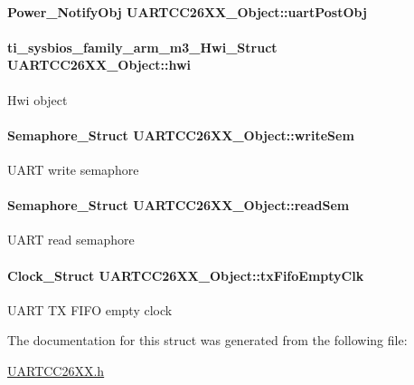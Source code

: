 \paragraph[{uart\-Post\-Obj}]{\setlength{\rightskip}{0pt plus 5cm}Power\-\_\-\-Notify\-Obj U\-A\-R\-T\-C\-C26\-X\-X\-\_\-\-Object\-::uart\-Post\-Obj}\label{struct_u_a_r_t_c_c26_x_x___object_a06f854831de50d17f7249224f560cdd5}
\paragraph[{hwi}]{\setlength{\rightskip}{0pt plus 5cm}ti\-\_\-sysbios\-\_\-family\-\_\-arm\-\_\-m3\-\_\-\-Hwi\-\_\-\-Struct U\-A\-R\-T\-C\-C26\-X\-X\-\_\-\-Object\-::hwi}\label{struct_u_a_r_t_c_c26_x_x___object_adfa38511dd1f8c470bb7f80afdfcd6eb}
Hwi object 
\paragraph[{write\-Sem}]{\setlength{\rightskip}{0pt plus 5cm}Semaphore\-\_\-\-Struct U\-A\-R\-T\-C\-C26\-X\-X\-\_\-\-Object\-::write\-Sem}\label{struct_u_a_r_t_c_c26_x_x___object_a216c349e650909bd84072c076051117d}
U\-A\-R\-T write semaphore 
\paragraph[{read\-Sem}]{\setlength{\rightskip}{0pt plus 5cm}Semaphore\-\_\-\-Struct U\-A\-R\-T\-C\-C26\-X\-X\-\_\-\-Object\-::read\-Sem}\label{struct_u_a_r_t_c_c26_x_x___object_ab81ce13969ecc77d764000ea53fb23d2}
U\-A\-R\-T read semaphore 
\paragraph[{tx\-Fifo\-Empty\-Clk}]{\setlength{\rightskip}{0pt plus 5cm}Clock\-\_\-\-Struct U\-A\-R\-T\-C\-C26\-X\-X\-\_\-\-Object\-::tx\-Fifo\-Empty\-Clk}\label{struct_u_a_r_t_c_c26_x_x___object_a97be7390556f78f9361505c4ee860469}
U\-A\-R\-T T\-X F\-I\-F\-O empty clock 

The documentation for this struct was generated from the following file\-:\begin{DoxyCompactItemize}
\item 
\hyperlink{_u_a_r_t_c_c26_x_x_8h}{U\-A\-R\-T\-C\-C26\-X\-X.\-h}\end{DoxyCompactItemize}

